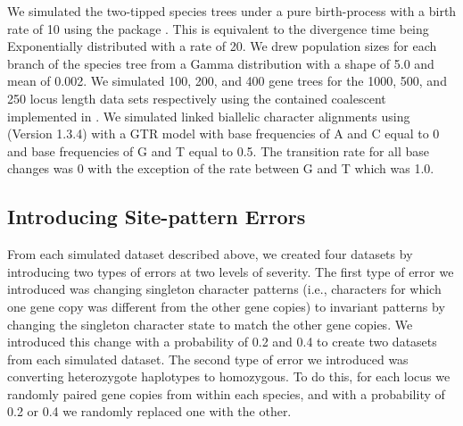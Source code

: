 We simulated the two-tipped species trees under a pure birth-process with a
birth rate of 10 using the \python package
\dendropy
\citep[Version 4.40;  branch commit eb69003;][]{Dendropy}.  
This is equivalent to the divergence time being Exponentially distributed with
a rate of 20.
We drew population sizes for each branch of the species tree from a Gamma 
distribution with a shape of 5.0 and mean of 0.002. We simulated 100, 200, and 
400 gene trees for the 1000, 500, and 250 locus length data sets respectively 
using the contained coalescent implemented in \dendropy.
We simulated linked biallelic character alignments using
\seqgen (Version 1.3.4)
\citep{rambautSeqGenApplicationMonte1997}
with a GTR model with base frequencies of A and C equal to 0 and base 
frequencies of G and T equal to 0.5. The transition rate for all base changes was 
0 with the exception of the rate between G and T which was 1.0. 

\subsection{Introducing Site-pattern Errors}
From each simulated dataset described above, we created four datasets by 
introducing two types of errors at two levels of severity. The first type of 
error we introduced was changing singleton character patterns (i.e., characters 
for which one gene copy was different from the other gene copies) to invariant 
patterns by changing the singleton character state to match the other gene 
copies. We introduced this change with a probability of 0.2 and 0.4 to create 
two datasets from each simulated dataset. The second type of error we introduced 
was converting heterozygote haplotypes to homozygous. To do this, for each locus 
we randomly paired gene copies from within each species, and with a probability 
of 0.2 or 0.4 we randomly replaced one with the other. 

